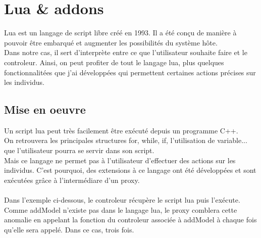 \begin{minipage}{\linewidth}%
\end{minipage}

\section{Lua \& addons}
Lua est un langage de script libre créé en 1993. Il a été conçu de manière à pouvoir être embarqué et augmenter les possibilités du système hôte.\\
Dans notre cas, il sert d'interprète entre ce que l'utilisateur souhaite faire et le controleur. Ainsi, on peut profiter de tout le langage lua, plus quelques fonctionnalitées que j'ai développées qui permettent certaines actions précises sur les individus.\\
\subsection{Mise en oeuvre}
Un script lua peut très facilement être exécuté depuis un programme C++. \\
On retrouvera les principales structures for, while, if, l'utilisation de variable... que l'utilisateur pourra se servir dans son script.\\
Mais ce langage ne permet pas à l'utilisateur d'effectuer des actions sur les individus. C'est pourquoi, des extensions à ce langage ont été développées et sont exécutées grâce à l'intermédiare d'un proxy.\\
\\
Dans l'exemple ci-dessous, le controleur récupère le script lua puis l'exécute. Comme addModel n'existe pas dans le langage lua, le proxy comblera cette anomalie en appelant la fonction du controleur associée à addModel à chaque fois qu'elle sera appelé. Dans ce cas, trois fois.\\

